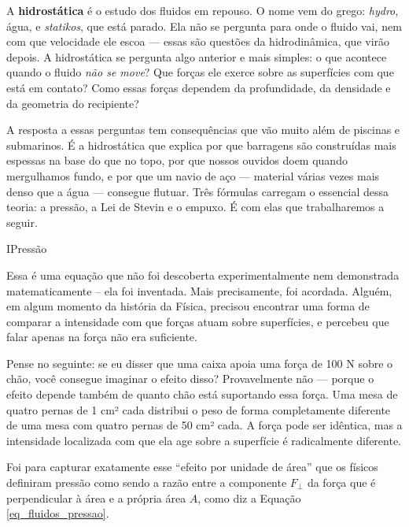 \lettrine{A}{} \textbf{hidrostática} é o estudo dos fluidos em repouso. O nome vem do grego:
\textit{hydro}, água, e \textit{statikos}, que está parado. Ela não se pergunta para
onde o fluido vai, nem com que velocidade ele escoa --- essas são questões da
hidrodinâmica, que virão depois. A hidrostática se pergunta algo anterior e mais
simples: o que acontece quando o fluido \textit{não se move}? Que forças ele exerce
sobre as superfícies com que está em contato? Como essas forças dependem da
profundidade, da densidade e da geometria do recipiente?

A resposta a essas perguntas tem consequências que vão muito além de piscinas e
submarinos. É a hidrostática que explica por que barragens são construídas mais
espessas na base do que no topo, por que nossos ouvidos doem quando mergulhamos
fundo, e por que um navio de aço --- material várias vezes mais denso que a água ---
consegue flutuar. Três fórmulas carregam o essencial dessa teoria: a pressão, a Lei
de Stevin e o empuxo. É com elas que trabalharemos a seguir.



\begin{secnivel}[Pressão]{I}{Pressão}
 

  
\end{secnivel}









Essa é uma equação que não foi descoberta experimentalmente nem demonstrada matematicamente -- ela foi inventada. Mais precisamente, foi acordada. Alguém, em algum momento da história da Física, precisou encontrar uma forma de comparar a intensidade com que forças atuam sobre superfícies, e percebeu que falar apenas na força não era suficiente.

Pense no seguinte: se eu disser que uma caixa apoia uma força de 100 N sobre o chão, você consegue imaginar o efeito disso? Provavelmente não — porque o efeito depende também de quanto chão está suportando essa força. Uma mesa de quatro pernas de 1 cm² cada distribui o peso de forma completamente diferente de uma mesa com quatro pernas de 50 cm² cada. A força pode ser idêntica, mas a intensidade localizada com que ela age sobre a superfície é radicalmente diferente.

Foi para capturar exatamente esse ``efeito por unidade de área'' que os físicos definiram pressão como sendo a razão entre a componente $F_\perp$ da força que é perpendicular à área e a própria área $A$, como diz a Equação \eqref{eq_fluidos_pressao}. 

